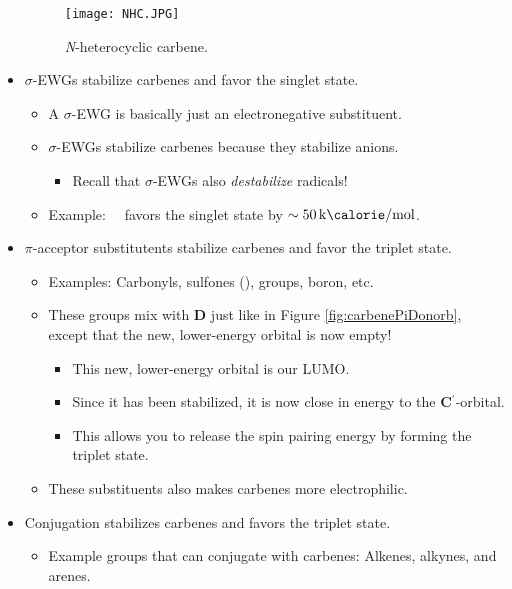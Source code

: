 \documentclass[../notes.tex]{subfiles}
\begin{document}
\begin{itemize}
    \begin{figure}[h!]
        \centering
        \texttt{[image: NHC.JPG]}
        \caption{\emph{N}-heterocyclic carbene.}
        \label{fig:NHC}
    \end{figure}
    \item $\sigma$-EWGs stabilize carbenes and favor the singlet state.
    \begin{itemize}
        \item A $\sigma$-EWG is basically just an electronegative substituent.
        \item $\sigma$-EWGs stabilize carbenes because they stabilize anions.
        \begin{itemize}
            \item Recall that $\sigma$-EWGs also \emph{destabilize} radicals!
        \end{itemize}
        \item Example: \ \ favors the singlet state by $\sim\SI[per-mode=symbol]{50}{\kilo\calorie\per\mole}$.
    \end{itemize}
    \item $\pi$-acceptor substitutents stabilize carbenes and favor the triplet state.
    \begin{itemize}
        \item Examples: Carbonyls, sulfones (),  groups, boron, etc.
        \item These groups mix with \textbf{D} just like in Figure \ref{fig:carbenePiDonorb}, except that the new, lower-energy orbital is now empty!
        \begin{itemize}
            \item This new, lower-energy orbital is our LUMO.
            \item Since it has been stabilized, it is now close in energy to the \textbf{C${}^{\bm{\prime}}$}-orbital.
            \item This allows you to release the spin pairing energy by forming the triplet state.
        \end{itemize}
        \item These substituents also makes carbenes more electrophilic.
    \end{itemize}
    \item Conjugation stabilizes carbenes and favors the triplet state.
    \begin{itemize}
        \item Example groups that can conjugate with carbenes: Alkenes, alkynes, and arenes.

\end{itemize}
\end{itemize}
\end{document}
